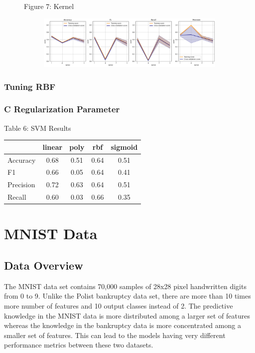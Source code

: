 \documentclass{article}
\begin{document}
\begin{figure}
	\centering
	Figure 7: Kernel\\
	\begin{subfigure}{\textwidth}
		\centering
		\includegraphics[width=\linewidth]{poland_svm_kernel.png}
		
	\end{subfigure}
	
	\label{fig:test}
\end{figure}

\subsubsection*{Tuning RBF}
\subsubsection*{C Regularization Parameter}


\begin{table}
	
	\centering
	Table 6: SVM Results \\
	\begin{tabular}{ l c c c c }
		\hline
		& linear & poly & rbf & sigmoid\\
		\hline
		Accuracy & 0.68 & 0.51 & 0.64 & 0.51 \\
		F1 & 0.66 & 0.05 & 0.64 & 0.41 \\
		Precision & 0.72 & 0.63 & 0.64 & 0.51  \\
		Recall & 0.60 & 0.03 & 0.66 & 0.35 \\
		\hline 
	\end{tabular}
\end{table}

\section{MNIST Data}
\subsection{Data Overview}
The MNIST data set contains 70,000 samples of 28x28 pixel handwritten digits from 0 to 9. Unlike the Polist bankruptcy data set, there are more than 10 times more number of features and 10 output classes instead of 2. The predictive knowledge in the MNIST data is more distributed among a larger set of features whereas the knowledge in the bankruptcy data is more concentrated among a smaller set of features. This can lead to the models having very different performance metrics between these two datasets. 
\end{document}
